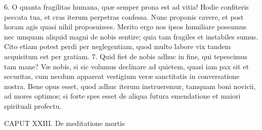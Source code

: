 \documentclass[twoside]{article}
\begin{document}
6. O quanta fragilitas humana, quæ semper prona est ad vitia! Hodie confiteris peccata tua, et cras iterum perpetras confessa. Nunc proponis cavere, et post horam agis quasi nihil proposuisses. Merito ergo nos ipsos humiliare possumus nec umquam aliquid magni de nobis sentire; quia tam fragiles et instabiles sumus. Cito etiam potest perdi per neglegentiam, quod multo labore vix tandem acquisitum est per gratiam.
7. Quid fiet de nobis adhuc in fine, qui tepescimus tam mane? Væ nobis, si sic volumus declinare ad quietem, quasi iam pax sit et securitas, cum necdum appareat vestigium veræ sanctitatis in conversatione nostra. Bene opus esset, quod adhuc iterum instrueremur, tamquam boni novicii, ad mores optimos; si forte spes esset de aliqua futura emendatione et maiori spirituali profectu.


CAPUT XXIII.
De meditatione mortis
\end{document}
